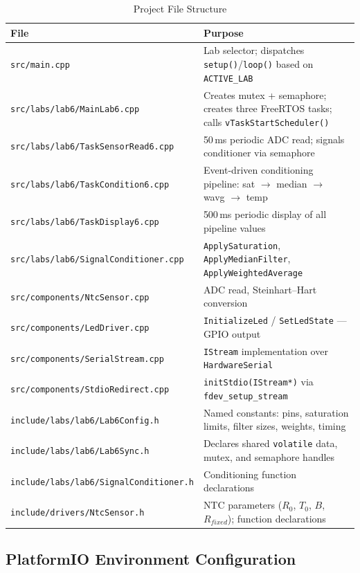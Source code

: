 \documentclass[12pt]{article}
\begin{document}
\begin{table}[H]
\centering
\begin{tabular}{@{}lp{8.2cm}@{}}
\toprule
\textbf{File} & \textbf{Purpose} \\
\midrule
\texttt{src/main.cpp}
  & Lab selector; dispatches \texttt{setup()}/\texttt{loop()} based on \texttt{ACTIVE\_LAB} \\
\texttt{src/labs/lab6/MainLab6.cpp}
  & Creates mutex + semaphore; creates three FreeRTOS tasks; calls \texttt{vTaskStartScheduler()} \\
\texttt{src/labs/lab6/TaskSensorRead6.cpp}
  & 50\,ms periodic ADC read; signals conditioner via semaphore \\
\texttt{src/labs/lab6/TaskCondition6.cpp}
  & Event-driven conditioning pipeline: sat $\to$ median $\to$ wavg $\to$ temp \\
\texttt{src/labs/lab6/TaskDisplay6.cpp}
  & 500\,ms periodic display of all pipeline values \\
\texttt{src/labs/lab6/SignalConditioner.cpp}
  & \texttt{ApplySaturation}, \texttt{ApplyMedianFilter}, \texttt{ApplyWeightedAverage} \\
\texttt{src/components/NtcSensor.cpp}
  & ADC read, Steinhart--Hart conversion \\
\texttt{src/components/LedDriver.cpp}
  & \texttt{InitializeLed} / \texttt{SetLedState} --- GPIO output \\
\texttt{src/components/SerialStream.cpp}
  & \texttt{IStream} implementation over \texttt{HardwareSerial} \\
\texttt{src/components/StdioRedirect.cpp}
  & \texttt{initStdio(IStream*)} via \texttt{fdev\_setup\_stream} \\
\texttt{include/labs/lab6/Lab6Config.h}
  & Named constants: pins, saturation limits, filter sizes, weights, timing \\
\texttt{include/labs/lab6/Lab6Sync.h}
  & Declares shared \texttt{volatile} data, mutex, and semaphore handles \\
\texttt{include/labs/lab6/SignalConditioner.h}
  & Conditioning function declarations \\
\texttt{include/drivers/NtcSensor.h}
  & NTC parameters ($R_0$, $T_0$, $B$, $R_{fixed}$); function declarations \\
\bottomrule
\end{tabular}
\caption{Project File Structure}
\label{tab:files}
\end{table}

\subsection{PlatformIO Environment Configuration}
\end{document}

